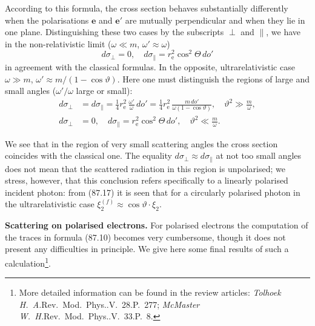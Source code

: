 
According to this formula, the cross section behaves substantially differently when the polarisations $\mathbf{e}$ and $\mathbf{e}'$ are mutually perpendicular and when they lie in one plane. Distinguishing these two cases by the subscripts $\perp$ and $\parallel$, we have in the non-relativistic limit ($\omega \ll m$, $\omega' \approx \omega$)
\begin{equation}
d\sigma_\perp = 0, \quad d\sigma_\parallel = r_\mathrm{e}^2\cos^2\Theta\,do'
\label{eq:87.20}
\end{equation}
in agreement with the classical formulas. In the opposite, ultrarelativistic case $\omega \gg m$, $\omega' \approx m/(1-\cos\vartheta)$. Here one must distinguish the regions of large and small angles ($\omega'/\omega$ large or small):
\begin{equation}
\begin{aligned}
d\sigma_\perp &= d\sigma_\parallel = \frac{1}{4}r_\mathrm{e}^2\,\frac{\omega'}{\omega}\,do' = \frac{1}{4}r_\mathrm{e}^2\,\frac{m\,do'}{\omega(1-\cos\vartheta)}, \quad \vartheta^2 \gg \frac{m}{\omega}, \\
d\sigma_\perp &= 0, \quad d\sigma_\parallel = r_\mathrm{e}^2\cos^2\Theta\,do', \quad \vartheta^2 \ll \frac{m}{\omega}.
\end{aligned}
\label{eq:87.21}
\end{equation}

We see that in the region of very small scattering angles the cross section coincides with the classical one. The equality $d\sigma_\perp \approx d\sigma_\parallel$ at not too small angles does not mean that the scattered radiation in this region is unpolarised; we stress, however, that this conclusion refers specifically to a linearly polarised incident photon: from (87.17) it is seen that for a circularly polarised photon in the ultrarelativistic case $\xi_2^{(f)} \approx \cos\vartheta \cdot \xi_2$.

\textbf{Scattering on polarised electrons.} For polarised electrons the computation of the traces in formula (87.10) becomes very cumbersome, though it does not present any difficulties in principle. We give here some final results of such a calculation\footnote{More detailed information can be found in the review articles: \emph{Tolhoek H.~A.}\/\/Rev.~Mod.~Phys..\enspace V.~28.\enspace P.~277; \emph{McMaster W.~H.}\/\/Rev.~Mod.~Phys..\enspace V.~33.\enspace P.~8.}.

